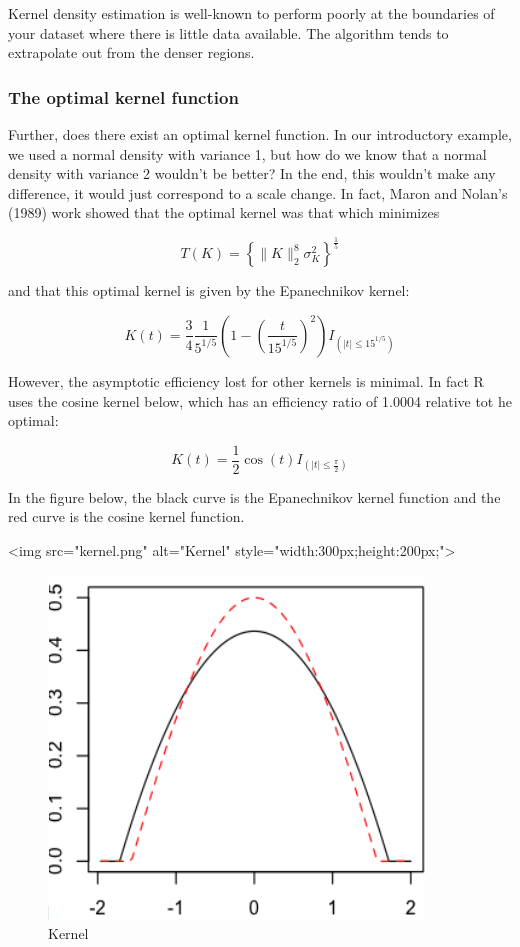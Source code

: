 Kernel density estimation is well-known to perform poorly at the boundaries of your dataset where there is little data available. The algorithm tends to extrapolate out from the denser regions.

\subsubsection*{The optimal kernel function}




Further, does there exist an optimal kernel function. In our introductory example, we used a normal density with variance 1, but how do we know that a normal density with variance 2 wouldn't be better? In the end, this wouldn't make any difference, it would just correspond to a scale change. In fact, Maron and Nolan's (1989) work showed that the optimal kernel was that which minimizes

$$T(K) = \left\{ \| K \|_2^8 \sigma^2_K \right\}^{\frac15}$$

and that this optimal kernel is given by the Epanechnikov kernel:

$$K(t) = \frac34 \frac{1}{5^{1/5}} \left( 1 - \left(\frac{t}{15^{1/5}}\right)^2\right) I_{\left(\vert t \vert \leq 15^{1/5}\right)}$$

However, the asymptotic efficiency lost for other kernels is minimal. In fact R uses the cosine kernel below, which has an efficiency ratio of 1.0004 relative tot he optimal:

$$K(t) = \frac12 \cos(t) I_{\left(\vert t \vert \leq \frac{\pi}{2}\right)}$$

In the figure below, the black curve is the Epanechnikov kernel function and the red curve is the cosine kernel function.


<img src="kernel.png" alt="Kernel" style="width:300px;height:200px;">


\begin{figure}[H]
\begin{center}
\includegraphics[scale=0.5]{kernel.png}
\end{center}
\caption{Kernel}
\label{fig:kernel}
\end{figure}

